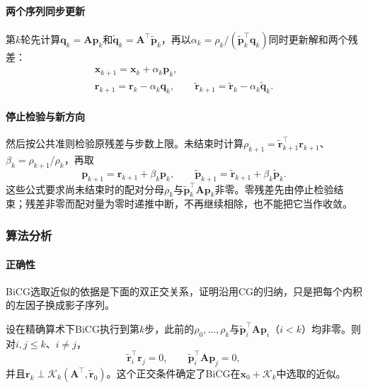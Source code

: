 \paragraph{两个序列同步更新}
第$k$轮先计算$\bm q_k=\bm A\bm p_k$和$\widetilde{\bm q}_k=\bm A^\top\widetilde{\bm p}_k$，再以$\alpha_k=\rho_k/(\widetilde{\bm p}_k^\top\bm q_k)$同时更新解和两个残差：
\[
 \begin{gathered}
 \bm x_{k+1}=\bm x_k+\alpha_k\bm p_k,\\
 \bm r_{k+1}=\bm r_k-\alpha_k\bm q_k,\qquad
 \widetilde{\bm r}_{k+1}=\widetilde{\bm r}_k-\alpha_k\widetilde{\bm q}_k .
 \end{gathered}
\]

\paragraph{停止检验与新方向}
然后按公共准则检验原残差与步数上限。未结束时计算$\rho_{k+1}=\widetilde{\bm r}_{k+1}^\top\bm r_{k+1}$、$\beta_k=\rho_{k+1}/\rho_k$，再取
\[
 \bm p_{k+1}=\bm r_{k+1}+\beta_k\bm p_k,\qquad
 \widetilde{\bm p}_{k+1}=\widetilde{\bm r}_{k+1}+\beta_k\widetilde{\bm p}_k .
\]
这些公式要求尚未结束时的配对分母$\rho_k$与$\widetilde{\bm p}_k^\top\bm A\bm p_k$非零。零残差先由停止检验结束；残差非零而配对量为零时递推中断，不再继续相除，也不能把它当作收敛。

\subsubsection{算法分析}

\paragraph{正确性}
BiCG选取近似的依据是下面的双正交关系，证明沿用CG的归纳，只是把每个内积的左因子换成影子序列。

\begin{theorem}[BiCG的双正交性]
\label{thm:ls-bicg-biorthogonality}
设在精确算术下BiCG执行到第$k$步，此前的$\rho_0,\ldots,\rho_k$与$\widetilde{\bm p}_i^\top\bm A\bm p_i$（$i<k$）均非零。则对$i,j\le k$、$i\ne j$，
\[
 \widetilde{\bm r}_i^\top\bm r_j=0,\qquad \widetilde{\bm p}_i^\top\bm A\bm p_j=0,
\]
并且$\bm r_k\perp\mathcal K_k(\bm A^\top,\widetilde{\bm r}_0)$。这个正交条件确定了BiCG在$\bm x_0+\mathcal K_k$中选取的近似。
\end{theorem}

